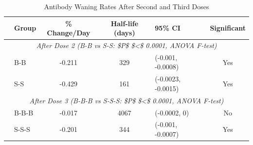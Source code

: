 
\begin{table}[!htbp]
\centering
\caption{Antibody Waning Rates After Second and Third Doses}
\label{tab:waning-slopes}
\small
\begin{tabular}{@{}l l c c l c@{}}
\toprule
     & Group & \% Change/Day & Half-life (days) & 95\% CI & Significant \\
\midrule
\multicolumn{6}{c}{\textit{After Dose 2 (B-B vs S-S: \$P\$ \$<\$ 0.0001, ANOVA F-test)}} \\
 & B-B & -0.211 & 329 & (-0.001, -0.0008) & Yes \\
 & S-S & -0.429 & 161 & (-0.0023, -0.0015) & Yes \\
\midrule
\multicolumn{6}{c}{\textit{After Dose 3 (B-B-B vs S-S-S: \$P\$ \$<\$ 0.0001, ANOVA F-test)}} \\
 & B-B-B & -0.017 & 4067 & (-0.0002, 0) & No \\
 & S-S-S & -0.201 & 344 & (-0.001, -0.0007) & Yes \\
\bottomrule
\end{tabular}
\end{table}

